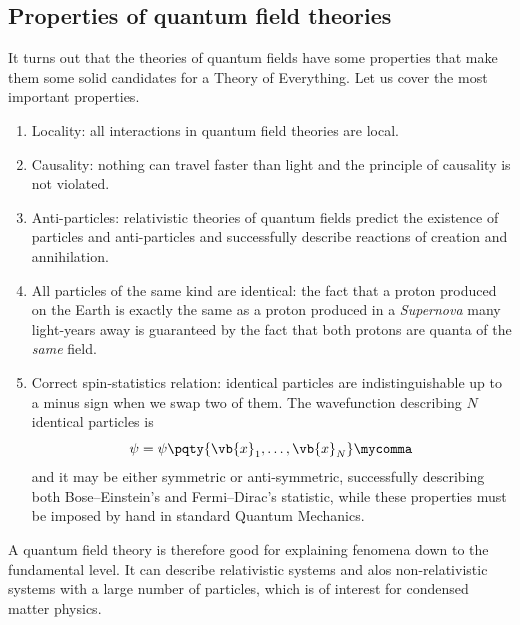         \subsection{Properties of quantum field theories}
            It turns out that the theories of quantum fields have some properties that make them some solid candidates for a Theory of Everything. Let us cover the most important properties.
            \begin{enumerate}
                \item Locality: all interactions in quantum field theories are local.
                \item Causality: nothing can travel faster than light and the principle of causality is not violated.
                \item Anti-particles: relativistic theories of quantum fields predict the existence of particles and anti-particles and successfully describe reactions of creation and annihilation.
                \item All particles of the same kind are identical: the fact that a proton produced on the Earth is exactly the same as a proton produced in a \textit{Supernova} many light-years away is guaranteed by the fact that both protons are quanta of the \emph{same} field.
                \item Correct spin-statistics relation: identical particles are indistinguishable up to a minus sign when we swap two of them. The wavefunction describing $N$ identical particles is
                \begin{equation*}
                    \psi = \psi\pqty{\vb{x}_1, \dotsc,\vb{x}_N}
                    \mycomma
                \end{equation*}
                and it may be either symmetric or anti-symmetric, successfully describing both Bose--Einstein's and Fermi--Dirac's statistic, while these properties must be imposed by hand in standard Quantum Mechanics.
            \end{enumerate}
            A quantum field theory is therefore good for explaining fenomena down to the fundamental level. It can describe relativistic systems and alos non-relativistic systems with a large number of particles, which is of interest for condensed matter physics.
